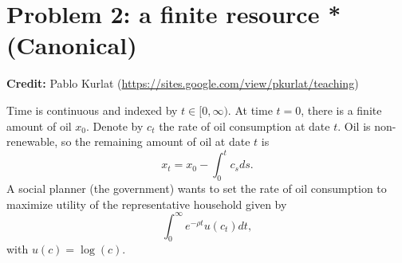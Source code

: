 \documentclass[11pt]{extarticle}
\theoremstyle{plain}
\theoremstyle{definition}
\begin{document}
\vspace{10mm}
\section*{Problem 2: a finite resource  * (Canonical)}

\textbf{Credit:} Pablo Kurlat (\url{https://sites.google.com/view/pkurlat/teaching})


\vspace{5mm}
\noindent
Time is continuous and indexed by $t \in [0, \infty)$. At time $t=0$, there is a finite amount of oil $x_0$. Denote by $c_t$ the rate of oil consumption at date $t$. Oil is non-renewable, so the remaining amount of oil at date $t$ is 
\begin{equation*}
	x_t = x_0 - \int_0^t c_s ds.
\end{equation*}
A social planner (the government) wants to set the rate of oil consumption to maximize utility of the representative household given by
\begin{equation*}
	\int_0^\infty e^{- \rho t} u(c_t) dt,
\end{equation*}
with $u(c) = \log(c)$. 
\end{document}
